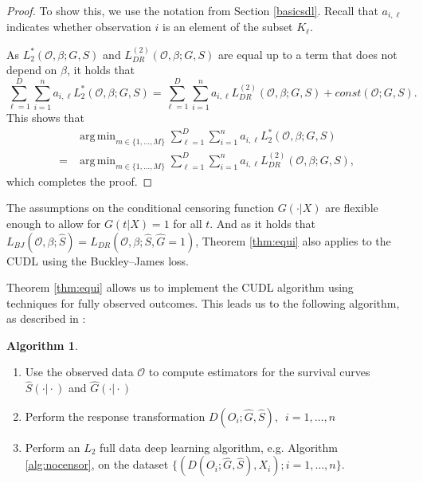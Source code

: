 \documentclass[12pt, a4paper]{scrartcl}
\theoremstyle{definition}
\newtheorem{Algorithm}{Algorithm}[section]
\theoremstyle{plain}
\numberwithin{equation}{section}
\numberwithin{figure}{section}
\numberwithin{table}{section}
\DeclareMathOperator*{\argmin}{arg\,min}
\begin{document}
\begin{proof}
		To show this, we use the notation from Section \ref{basicsdl}.
		Recall that $a_{i,\ell}$ indicates whether observation $i$ is an element of the subset $K_\ell$.
		
		As $L_2^*(\mathcal{O}, \beta; G,S)$ and $L_{DR}^{(2)}(\mathcal{O}, \beta; G,S)$ are equal up to a term that does not depend on $\beta$, it holds that
		\begin{equation*}
		\sum_{\ell=1}^{D} \sum_{i=1}^{n} a_{i,\ell} L_2^*(\mathcal{O}, \beta; G,S) = \sum_{\ell=1}^{D} \sum_{i=1}^{n} a_{i,\ell} L_{DR}^{(2)}(\mathcal{O}, \beta; G,S) + const(\mathcal{O}; G,S).
		\end{equation*}
		This shows that
		\begin{equation*}
		\begin{split}
		 &\argmin_{m \in \{1,\dots, M\}}\sum_{\ell=1}^{D} \sum_{i=1}^{n} a_{i,\ell} L_2^*(\mathcal{O}, \beta; G,S)\\
		  = &\argmin_{m \in \{1,\dots, M\}}\sum_{\ell=1}^{D} \sum_{i=1}^{n} a_{i,\ell} L_{DR}^{(2)}(\mathcal{O}, \beta; G,S),
		 \end{split}
		\end{equation*}
		which completes the proof.
	\end{proof}

	The assumptions on the conditional censoring function $G(\cdot\vert X)$ are flexible enough to allow for $G(t\vert X)=1$ for all $t$.
	And as it holds that $L_{BJ}(\mathcal{O}, \beta; \hat{S})=L_{DR}(\mathcal{O}, \beta; \hat{S}, \hat{G} = 1)$, Theorem \ref{thm:equi} also applies to the CUDL using the Buckley--James loss.
	
	Theorem \ref{thm:equi} allows us to implement the CUDL algorithm using techniques for fully observed outcomes.
	This leads us to the following algorithm, as described in \citet*{basearticle}:
	\begin{Algorithm}\label{alg:censor}~
		\begin{enumerate}
			\item Use the observed data $\mathcal{O}$ to compute estimators for the survival curves $\hat{S}(\cdot\vert\cdot)$ and $\hat{G}(\cdot\vert\cdot)$
			\item Perform the response transformation $D(O_i; \hat{G},\hat{S}),$~$ i = 1,\dots,n$
			\item Perform an $L_2$ full data deep learning algorithm, e.g. Algorithm \ref{alg:nocensor}, on the dataset $\{(D(O_i; \hat{G},\hat{S}), X_i); i = 1,\dots,n\}$.
		\end{enumerate}
	\end{Algorithm}
\end{document}
